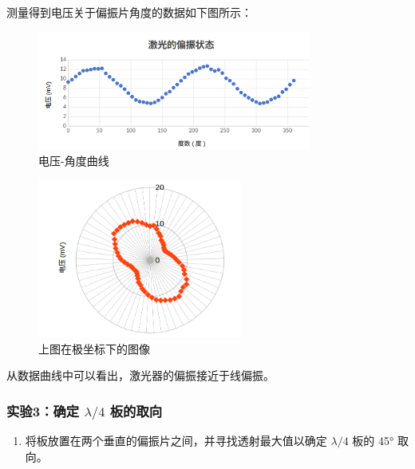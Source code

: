 \documentclass{ctexart}
\begin{document}
测量得到电压关于偏振片角度的数据如下图所示：
\begin{figure}[H]
    \centering
    \includegraphics[width=0.8\textwidth]{实验二.png}
    \caption{电压-角度曲线}
\end{figure}
\begin{figure}[H]
    \centering
    \includegraphics[width=0.6\textwidth]{实验二-2.png}
    \caption{上图在极坐标下的图像}
\end{figure}

从数据曲线中可以看出，激光器的偏振接近于线偏振。

\subsubsection{实验3：确定 $\lambda/4$ 板的取向}
\begin{enumerate}
    \item 将板放置在两个垂直的偏振片之间，并寻找透射最大值以确定 $\lambda/4$ 板的 45° 取向。
\end{enumerate}
\end{document}
